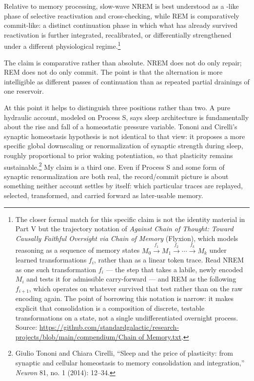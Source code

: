 \documentclass[11pt]{article}
\begin{document}
\begin{claim}
Relative to memory processing, slow-wave NREM is best understood as a \repair-like phase of selective reactivation and cross-checking, while REM is comparatively commit-like: a distinct continuation phase in which what has already survived reactivation is further integrated, recalibrated, or differentially strengthened under a different physiological regime.\footnote{The closer formal match for this specific claim is not the identity material in Part V but the trajectory notation of \emph{Against Chain of Thought: Toward Causally Faithful Oversight via Chain of Memory} (Flyxion), which models reasoning as a sequence of memory states $M_0 \xrightarrow{f_1} M_1 \xrightarrow{f_2} \cdots \xrightarrow{f_k} M_k$ under learned transformations $f_i$, rather than as a linear token trace. Read NREM as one such transformation $f_i$ --- the step that takes a labile, newly encoded $M_i$ and tests it for admissible carry-forward --- and REM as the following $f_{i+1}$, which operates on whatever survived that test rather than on the raw encoding again. The point of borrowing this notation is narrow: it makes explicit that consolidation is a composition of discrete, testable transformations on a state, not a single undifferentiated overnight process. Source: \url{https://github.com/standardgalactic/research-projects/blob/main/compendium/Chain of Memory.txt}.}
\end{claim}

The claim is comparative rather than absolute. NREM does not do only repair; REM does not do only commit. The point is that the alternation is more intelligible as different passes of continuation than as repeated partial drainings of one reservoir.

At this point it helps to distinguish three positions rather than two. A pure hydraulic account, modeled on Process S, says sleep architecture is fundamentally about the rise and fall of a homeostatic pressure variable. Tononi and Cirelli's synaptic homeostasis hypothesis is not identical to that view: it proposes a more specific global downscaling or renormalization of synaptic strength during sleep, roughly proportional to prior waking potentiation, so that plasticity remains sustainable.\footnote{Giulio Tononi and Chiara Cirelli, ``Sleep and the price of plasticity: from synaptic and cellular homeostasis to memory consolidation and integration,'' \emph{Neuron} 81, no. 1 (2014): 12--34.} My claim is a third one. Even if Process S and some form of synaptic renormalization are both real, the record/commit picture is about something neither account settles by itself: which particular traces are replayed, selected, transformed, and carried forward as later-usable memory.
\end{document}
